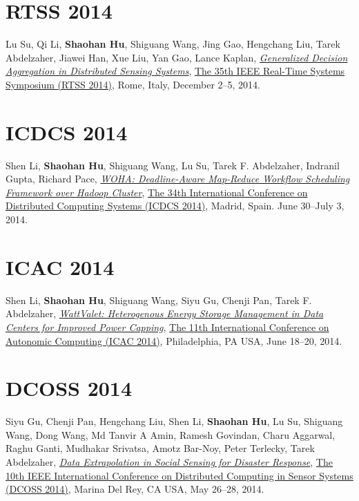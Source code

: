 \section{\sc RTSS 2014}\hypertarget{su2014rtss}{}
Lu Su, Qi Li, \textbf{Shaohan Hu}, Shiguang Wang, Jing Gao, Hengchang Liu, Tarek Abdelzaher, Jiawei Han, Xue Liu, Yan Gao, Lance Kaplan,
\href{http://ieeexplore.ieee.org/document/7010369}{\emph{Generalized Decision Aggregation in Distributed Sensing Systems}},
\href{http://2014.rtss.org/}{\textsf{The 35th IEEE Real-Time Systems Symposium (RTSS 2014)}},
Rome, Italy, December 2--5, 2014.

\section{\sc ICDCS 2014}\hypertarget{li2014icdcs}{}
Shen Li, \textbf{Shaohan Hu}, Shiguang Wang, Lu Su, Tarek F. Abdelzaher, Indranil Gupta, Richard Pace,
\href{http://ieeexplore.ieee.org/document/6888886}{\emph{WOHA: Deadline-Aware Map-Reduce Workflow Scheduling Framework over Hadoop Cluster}},
\href{http://lsd.ls.fi.upm.es/icdcs2014}{\textsf{The 34th International Conference on Distributed Computing Systems (ICDCS 2014)}},
Madrid, Spain. June 30--July 3, 2014.

\section{\sc ICAC 2014}\hypertarget{li2014icac}{}
Shen Li, \textbf{Shaohan Hu}, Shiguang Wang, Siyu Gu, Chenji Pan, Tarek F. Abdelzaher,
\href{https://www.usenix.org/system/files/conference/icac14/icac14-paper-li_shen.pdf}{\emph{WattValet: Heterogenous Energy Storage Management in Data Centers for Improved Power Capping}},
\href{https://www.usenix.org/conference/icac14}{\textsf{The 11th International Conference on Autonomic Computing (ICAC 2014)}},
Philadelphia, PA USA, June 18--20, 2014.

\section{\sc DCOSS 2014}\hypertarget{gu2014dcoss}{}
Siyu Gu, Chenji Pan, Hengchang Liu, Shen Li, \textbf{Shaohan Hu}, Lu Su, Shiguang Wang, Dong Wang, Md Tanvir A Amin, Ramesh Govindan, Charu Aggarwal, Raghu Ganti, Mudhakar Srivatsa, Amotz Bar-Noy, Peter Terlecky, Tarek Abdelzaher,
\href{http://ieeexplore.ieee.org/document/6846153}{\emph{Data Extrapolation in Social Sensing for Disaster Response}},
\href{http://www.dcoss.org/dcoss14/}{\textsf{The 10th IEEE International Conference on Distributed Computing in Sensor Systems (DCOSS 2014)}},
Marina Del Rey, CA USA, May 26--28, 2014.

